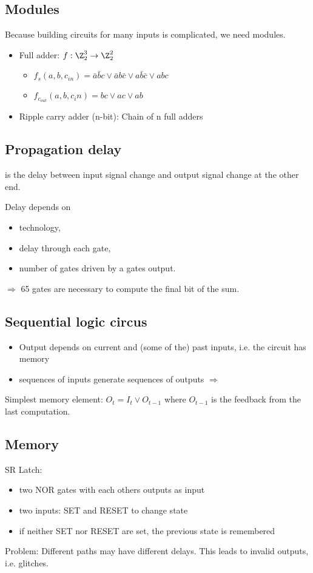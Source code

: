 \documentclass{article}
\begin{document}
\subsection{Modules}
Because building circuits for many inputs is complicated, we need modules.
\begin{itemize}
	\item Full adder: $f:\Z_2^3\to\Z_2^2$\begin{itemize}
		\item $f_s(a,b,c_{in})=\bar{a}\bar{b}c\vee \bar{a}b\bar{c} \vee a\bar{b}\bar{c} \vee abc$
		\item $f_{c_{out}}(a,b,c_in)=bc\vee ac\vee ab$
	\end{itemize}
	\item Ripple carry adder (n-bit): Chain of n full adders
\end{itemize}
\subsection{Propagation delay}
\begin{definition}
	 is the delay between input signal
	change and output signal change at the other end.
\end{definition}
Delay depends on
\begin{itemize}
	\item technology,
	\item delay through each gate,
	\item number of gates driven by a gates output.
\end{itemize}
$\Rightarrow$ 65 gates are necessary to compute the final bit of the sum.
\subsection{Sequential logic circus}
\begin{itemize}
	\item Output depends on current and (some of the) past inputs, i.e. the circuit has memory
	\item sequences of inputs generate sequences of outputs $\Rightarrow$ 
\end{itemize}
Simplest memory element: $O_t = I_t \vee O_{t-1}$ where $O_{t-1}$ is the feedback from the last
computation. 
\subsection{Memory}
SR Latch:
\begin{itemize}
	\item two NOR gates with each others outputs as input
	\item two inputs: SET and RESET to change state
	\item if neither SET nor RESET are set, the previous state is remembered
\end{itemize}
Problem: Different paths may have different delays. This leads to invalid outputs, i.e. glitches.
\end{document}
